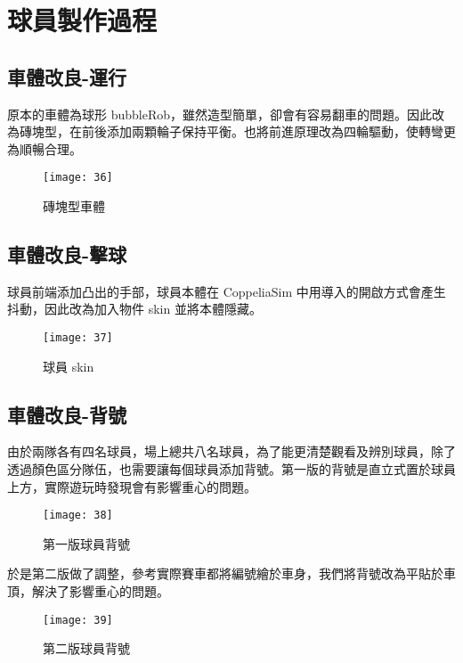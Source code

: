 \chapter{球員製作過程}
\renewcommand{\baselinestretch}{10.0} %
\setcounter{page}{2}  %
\fontsize{14pt}{2.5pt}\sectionef
\section{車體改良-運行}
  原本的車體為球形 bubbleRob，雖然造型簡單，卻會有容易翻車的問題。因此改為磚塊型，在前後添加兩顆輪子保持平衡。也將前進原理改為四輪驅動，使轉彎更為順暢合理。\\[1pt]
\begin{figure}[hbt!]
\begin{center}
\texttt{[image: 36]}
\caption{\Large 磚塊型車體}\label{fig.36}
\end{center}
\end{figure} 
\section{車體改良-擊球}
  球員前端添加凸出的手部，球員本體在 CoppeliaSim 中用導入的開啟方式會產生抖動，因此改為加入物件 skin 並將本體隱藏。\\[1pt]
\begin{figure}[hbt!]
\begin{center}
\texttt{[image: 37]}
\caption{\Large 球員 skin}\label{fig.37}
\end{center}
\end{figure} 
\newpage
\section{車體改良-背號}
  由於兩隊各有四名球員，場上總共八名球員，為了能更清楚觀看及辨別球員，除了透過顏色區分隊伍，也需要讓每個球員添加背號。第一版的背號是直立式置於球員上方，實際遊玩時發現會有影響重心的問題。\\
\begin{figure}[hbt!]
\begin{center}
\texttt{[image: 38]}
\caption{\Large 第一版球員背號}\label{fig.38}
\end{center}
\end{figure}


於是第二版做了調整，參考實際賽車都將編號繪於車身，我們將背號改為平貼於車頂，解決了影響重心的問題。\\
\begin{figure}[hbt!]
\begin{center}
\texttt{[image: 39]}
\caption{\Large 第二版球員背號}\label{fig.39}
\end{center}
\end{figure}

\renewcommand{\baselinestretch}{1} %